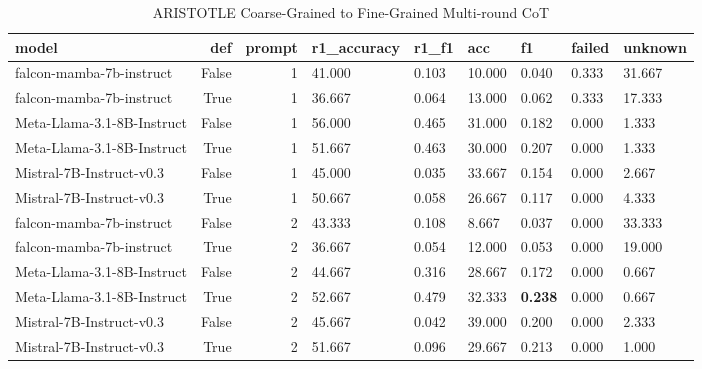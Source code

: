\begin{table}[H]
\centering
\caption{ARISTOTLE Coarse-Grained to Fine-Grained Multi-round CoT}
\begin{tabular}{lrrllllll}
\toprule
model & def & prompt & r1\_accuracy & r1\_f1 & acc & f1 & failed & unknown \\
\midrule
falcon-mamba-7b-instruct & False & 1 & 41.000 & 0.103 & 10.000 & 0.040 & 0.333 & 31.667 \\
falcon-mamba-7b-instruct & True & 1 & 36.667 & 0.064 & 13.000 & 0.062 & 0.333 & 17.333 \\
Meta-Llama-3.1-8B-Instruct & False & 1 & 56.000 & 0.465 & 31.000 & 0.182 & 0.000 & 1.333 \\
Meta-Llama-3.1-8B-Instruct & True & 1 & 51.667 & 0.463 & 30.000 & 0.207 & 0.000 & 1.333 \\
Mistral-7B-Instruct-v0.3 & False & 1 & 45.000 & 0.035 & 33.667 & 0.154 & 0.000 & 2.667 \\
Mistral-7B-Instruct-v0.3 & True & 1 & 50.667 & 0.058 & 26.667 & 0.117 & 0.000 & 4.333 \\
falcon-mamba-7b-instruct & False & 2 & 43.333 & 0.108 & 8.667 & 0.037 & 0.000 & 33.333 \\
falcon-mamba-7b-instruct & True & 2 & 36.667 & 0.054 & 12.000 & 0.053 & 0.000 & 19.000 \\
Meta-Llama-3.1-8B-Instruct & False & 2 & 44.667 & 0.316 & 28.667 & 0.172 & 0.000 & 0.667 \\
Meta-Llama-3.1-8B-Instruct & True & 2 & 52.667 & 0.479 & 32.333 & \textbf{0.238} & 0.000 & 0.667 \\
Mistral-7B-Instruct-v0.3 & False & 2 & 45.667 & 0.042 & 39.000 & 0.200 & 0.000 & 2.333 \\
Mistral-7B-Instruct-v0.3 & True & 2 & 51.667 & 0.096 & 29.667 & 0.213 & 0.000 & 1.000 \\
\bottomrule
\end{tabular}
\end{table}